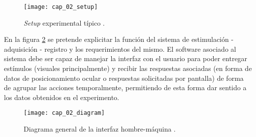 \documentclass[../Main.tex]{subfiles}
\begin{document}
		\begin{figure}[H]
			\centering
			\texttt{[image: cap\_02\_setup]}
			\caption[\textit{Setup} experimental típico]{\textit{Setup} experimental típico \cite{article:baseInfo}.}
			\label{fig:02_ejemplo_setup}
		\end{figure}

		En la figura \ref{fig:02_diagrama_interfaz} se pretende explicitar la función del sistema de estimulación - adquisición - registro y los requerimientos del mismo. El software asociado al sistema debe ser capaz de manejar la interfaz con el usuario para poder entregar estímulos (visuales principalmente) y recibir las respuestas asociadas (en forma de datos de posicionamiento ocular o respuestas solicitadas por pantalla) de forma de agrupar las acciones temporalmente, permitiendo de esta forma dar sentido a los datos obtenidos en el experimento. 
		
		\begin{figure}[H]
			\centering
			\texttt{[image: cap\_02\_diagram]}
			\caption[Diagrama general de la interfaz hombre-máquina]{Diagrama general de la interfaz hombre-máquina \cite{article:baseInfo}.}
			\label{fig:02_diagrama_interfaz}
		\end{figure}

\end{document}
